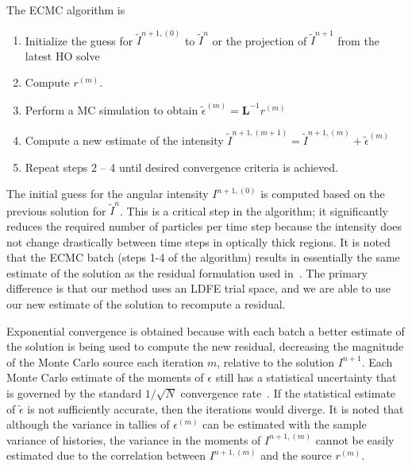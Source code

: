 \documentclass{mc2013}
\newcommand{\B}[1]{\ensuremath{\mathbf{#1}}}
\begin{document}
The ECMC algorithm is
\begin{enumerate}
    \item Initialize the guess for $\tilde{I}^{n+1,(0)}$ to $\tilde{I}^{n}$ or the
        projection of $\tilde{I}^{n+1}$ from the latest HO solve
\item Compute $r^{(m)}$.
\item Perform a MC simulation to obtain $\tilde{\epsilon}^{(m)} = \B L^{-1} r^{(m)}$
\item Compute a new estimate of the intensity $\tilde I^{n+1,(m+1)} = \tilde I^{n+1,(m)}
+ \tilde\epsilon^{(m)}$
\item Repeat steps 2 -- 4 until desired convergence criteria is achieved. 
\end{enumerate}
The initial guess for the angular intensity $I^{n+1,(0)}$ is computed based on the previous solution
for $\tilde{I}^{n}$. This is a critical step in the algorithm; it significantly reduces the required number of
particles per time step because the intensity does not change drastically between time steps in
optically thick regions.  It is noted that the ECMC batch (steps 1-4 of the
algorithm) results in essentially the same estimate of the solution as the residual
formulation used in~\cite{rmc}.  The primary difference is that our method uses an LDFE trial
space, and we are able to use our new estimate of the solution to recompute a
residual.

Exponential convergence is obtained because with each batch a
better estimate of the solution is being used to compute the new residual, decreasing
the magnitude of the Monte Carlo source each iteration $m$, relative to the solution
$I^{n+1}$.  Each Monte Carlo
estimate of the moments of $\epsilon$ still has a statistical uncertainty that is
governed by the standard $1/\sqrt{N}$ convergence rate~\cite{shultis_mc}.  If the statistical estimate of $\tilde\epsilon$ is not sufficiently
accurate, then the iterations would diverge. It is noted that although the
variance in tallies of $\epsilon^{(m)}$ can be estimated with the sample variance of
histories, the variance in the moments of $I^{n+1,(m)}$ cannot be easily
estimated due to the correlation between $I^{n+1,(m)}$ and the source
$r^{(m)}$.
\end{document}
